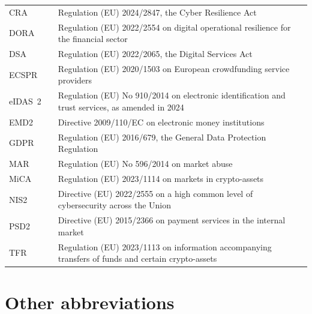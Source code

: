 \begin{xltabular}{\textwidth}{@{}L{20mm}YY@{}}
CRA & & Regulation (EU) 2024/2847, the Cyber Resilience Act \\
DORA & & Regulation (EU) 2022/2554 on digital operational resilience for the financial sector \\
DSA & & Regulation (EU) 2022/2065, the Digital Services Act \\
ECSPR & & Regulation (EU) 2020/1503 on European crowdfunding service providers \\
eIDAS~2 & & Regulation (EU) No 910/2014 on electronic identification and trust services, as amended in 2024 \\
EMD2 & & Directive 2009/110/EC on electronic money institutions \\
GDPR & & Regulation (EU) 2016/679, the General Data Protection Regulation \\
MAR & & Regulation (EU) No 596/2014 on market abuse \\
MiCA & & Regulation (EU) 2023/1114 on markets in crypto-assets \\
NIS2 & & Directive (EU) 2022/2555 on a high common level of cybersecurity across the Union \\
PSD2 & & Directive (EU) 2015/2366 on payment services in the internal market \\
TFR & & Regulation (EU) 2023/1113 on information accompanying transfers of funds and certain crypto-assets \\
\end{xltabular}

\section{Other abbreviations}\label{sec:glossary:other}

